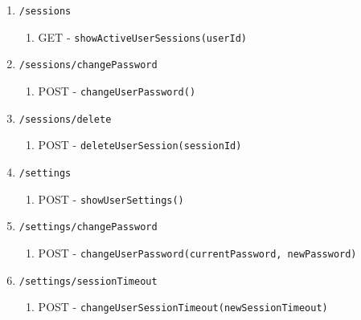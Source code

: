 \documentclass[12pt,DIV14,BCOR10mm,a4paper,parskip=half-,headsepline,headinclude,english,ngerman,bibliography=totocnumbered]{scrreprt}
\begin{document}
\begin{enumerate}
\begin{enumerate}
\begin{enumerate}
\begin{enumerate}
      \end{enumerate}
      \item \texttt{/sessions}
      \begin{enumerate}
        \item GET - \texttt{showActiveUserSessions(userId)}
      \end{enumerate}
      \item \texttt{/sessions/changePassword}
      \begin{enumerate}
        \item POST - \texttt{changeUserPassword()}
      \end{enumerate}
      \item \texttt{/sessions/delete}
      \begin{enumerate}
        \item POST - \texttt{deleteUserSession(sessionId)}
      \end{enumerate}
      \item \texttt{/settings}
      \begin{enumerate}
        \item POST - \texttt{showUserSettings()}
      \end{enumerate}
      \item \texttt{/settings/changePassword}
      \begin{enumerate}
        \item POST - \texttt{changeUserPassword(currentPassword, newPassword)}
      \end{enumerate}
      \item \texttt{/settings/sessionTimeout}
      \begin{enumerate}
        \item POST - \texttt{changeUserSessionTimeout(newSessionTimeout)}
      \end{enumerate}
    \end{enumerate}


\end{enumerate}
\end{enumerate}
\end{document}
